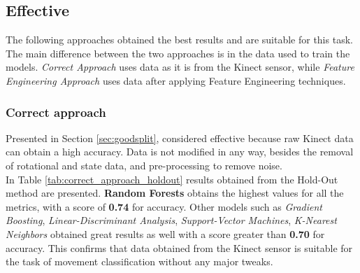         \subsection{Effective}

                The following approaches obtained the best results and are suitable for this task. The main difference between the two approaches is in the data used to train the models. \textit{Correct Approach} uses data as it is from the Kinect sensor, while \textit{Feature Engineering Approach} uses data after applying Feature Engineering techniques.
                
            \subsubsection{Correct approach}

                Presented in Section \ref{sec:goodsplit}, considered effective because raw Kinect data can obtain a high accuracy. Data is not modified in any way, besides the removal of rotational and state data, and pre-processing to remove noise.\\
                 
                In Table \ref{tab:correct_approach_holdout} results obtained from the Hold-Out method are presented. \textbf{Random Forests} obtains the highest values for all the metrics, with a score of \textbf{0.74} for accuracy. Other models such as \textit{Gradient Boosting}, \textit{Linear-Discriminant Analysis}, \textit{Support-Vector Machines}, \textit{K-Nearest Neighbors} obtained great results as well with a score greater than \textbf{0.70} for accuracy. This confirms that data obtained from the Kinect sensor is suitable for the task of movement classification without any major tweaks.\\
                
                \newpage

